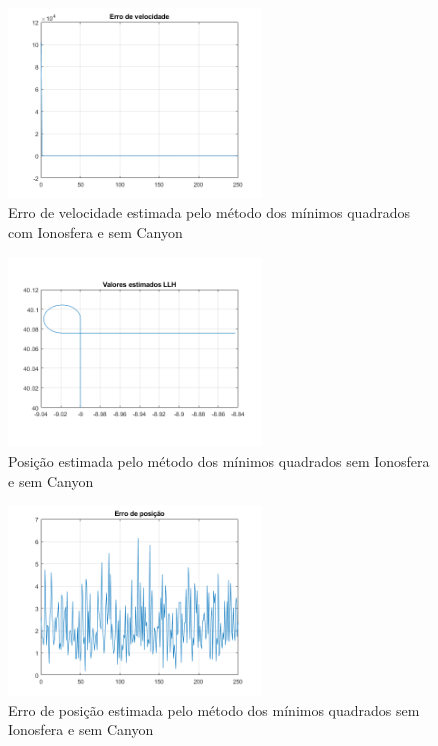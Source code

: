 \documentclass[palatino]{ist-report}
\begin{document}
\begin{figure}[ht]
	\centering
	\includegraphics[width=0.6\textwidth]{graphics/erro_velocidade13.png}
	\caption{Erro de velocidade estimada pelo método dos mínimos quadrados com Ionosfera e sem Canyon}
	\label{eVelocidade13}
\end{figure}


\begin{figure}[ht]
	\centering
	\includegraphics[width=0.6\textwidth]{graphics/plot_posicao_estimada_LLH14.png}
	\caption{Posição estimada pelo método dos mínimos quadrados sem Ionosfera e sem Canyon}
	\label{posicao14}
\end{figure}


\begin{figure}[ht]
	\centering
	\includegraphics[width=0.6\textwidth]{graphics/erro_posicao14.png}
	\caption{Erro de posição estimada pelo método dos mínimos quadrados sem Ionosfera e sem Canyon}
	\label{eposicao14}
\end{figure}
\end{document}
